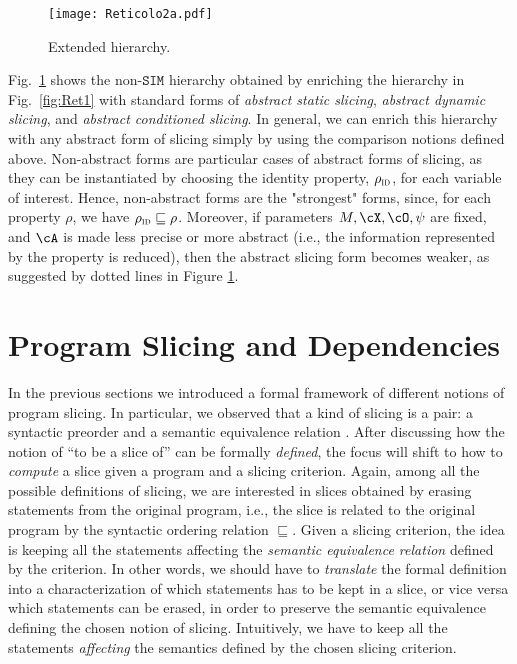 \documentclass[prodmode,acmtocl]{acmsmall}
\newcommand{\absstcslcg}{\emph{abstract static slicing}}
\newcommand{\absdynslcg}{\emph{abstract dynamic slicing}}
\newcommand{\absconslcg}{\emph{abstract conditioned slicing}}
\newcommand{\caX}{\cX}
\def\uco{\ensuremath{\rho}\xspace}
\def\SIM{\ensuremath{\mathtt{SIM}}\xspace}
\newcommand{\0}{\mbox{\bf 0}}
\def\IDDOM{\ensuremath{\uco_{\textsc{id}}}\xspace}
\begin{document}
\begin{figure}[htbp]
 \centering
    \texttt{[image: Reticolo2a.pdf]}
  \caption{Extended hierarchy. \label{fig:Ret2}}
\end{figure}
Fig.~\ref{fig:Ret2} shows the non-\SIM hierarchy obtained by enriching
the hierarchy in Fig.~\ref{fig:Ret1} with standard forms of
\absstcslcg, \absdynslcg{}, and \absconslcg.  In general, we can
enrich this hierarchy with any abstract form of slicing simply by
using the comparison notions defined above.  Non-abstract forms are
particular cases of abstract forms of slicing, as they can be
instantiated by choosing the identity property, $\IDDOM$, for each
variable of interest.  Hence, non-abstract forms are the "strongest"
forms, since, for each property $\uco$, we have $\IDDOM \sqsubseteq
\uco$.  Moreover, if parameters $M, \caX, \cO, \psi$ are fixed, and
$\cA$ is made less precise or more abstract (i.e., the information
represented by the property is reduced), then the abstract slicing
form becomes weaker, as suggested by dotted lines in Figure
\ref{fig:Ret2}.



\section{Program Slicing and Dependencies}
\label{subsection:dependencies}
In the previous sections we introduced a formal framework of different
notions of program slicing.  In particular, we observed that a kind of
slicing is a pair: a syntactic preorder and a semantic equivalence
relation \cite{AForm}.  After discussing how the notion of ``to be a
slice of'' can be formally \emph{defined}, the focus will shift to how
to \emph{compute} a slice given a program and a slicing criterion.
Again, among all the possible definitions of slicing, we are
interested in slices obtained by erasing statements from the original
program, i.e., the slice is related to the original program by the
syntactic ordering relation $\sqsubseteq$.  Given a slicing criterion,
the idea is keeping all the statements affecting the \emph{semantic
  equivalence relation} defined by the criterion.  In other words, we
should have to \emph{translate} the formal definition into a
characterization of which statements has to be kept in a slice, or
vice versa which statements can be erased, in order to preserve the
semantic equivalence defining the chosen notion of slicing.
Intuitively, we have to keep all the statements \emph{affecting} the
semantics defined by the chosen slicing criterion.
\end{document}
